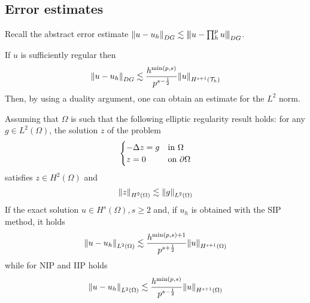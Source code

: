 \subsection{Error estimates}
Recall the abstract error estimate \(\norm{u - u_h}_{DG} \lesssim \threenorm{u-\prod_{h}^{p}u}{DG}\).

If \(u\) is sufficiently regular then
\[
    \norm{u-u_h}_{DG} \lesssim \frac{h^{\min(p,s)}}{p^{s-\frac{1}{2}}}\norm{u}_{H^{s+1}(\mathcal{T}_h)}
\]
Then, by using a duality argument, one can obtain an estimate for the \(L^2\) norm.

Assuming that \(\Omega\) is such that the following elliptic regularity result holds: for any \(g \in L^2(\Omega)\), the solution \(z\) of the problem
\[
   \begin{cases}
     -\Delta z = g & \text{in }\Omega \\
     z = 0 & \text{on } \partial\Omega
   \end{cases}
\]
satisfies \(z \in H^2(\Omega)\) and 
\[
    \norm{z}_{H^2(\Omega)} \lesssim \norm{g}_{L^2(\Omega)}
\]
If the exact solution \(u \in H^s(\Omega), s \geq 2\) and, if \(u_h\) is obtained with the SIP method, it holds 
\[
    \norm{u-u_h}_{L^2(\Omega)} \lesssim \frac{h^{\min(p,s)+1}}{p^{s+\frac{1}{2}}}\norm{u}_{H^{s+1}(\Omega)}
\]
while for NIP and IIP holds
\[
    \norm{u-u_h}_{L^2(\Omega)} \lesssim \frac{h^{\min(p,s)}}{p^{s-\frac{1}{2}}}\norm{u}_{H^{s+1}(\Omega)}
\]